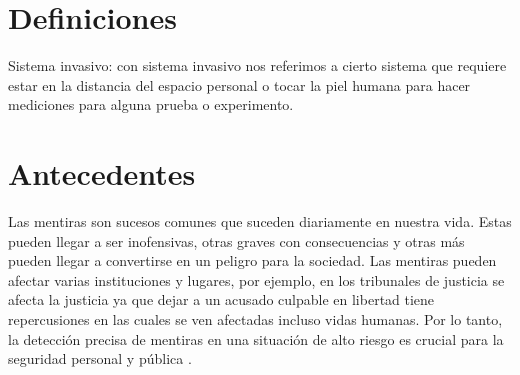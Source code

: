 \begin{onehalfspacing}
\section{Definiciones}
\label{sec:Definiciones}

Sistema invasivo: con sistema invasivo nos referimos a cierto sistema que requiere estar en la distancia del espacio personal o tocar la piel humana para hacer mediciones para alguna prueba o experimento.

\section{Antecedentes}
\label{sec:Antecedentes}

Las mentiras son sucesos comunes que suceden diariamente en nuestra vida. Estas pueden llegar a ser inofensivas, otras graves con consecuencias y otras más pueden llegar a convertirse en un peligro para la sociedad. Las mentiras pueden afectar varias instituciones y lugares, por ejemplo,  en los tribunales de justicia se afecta la justicia ya que dejar a un acusado culpable en libertad tiene repercusiones en las cuales se ven afectadas incluso vidas humanas. Por lo tanto, la detección precisa de mentiras en una situación de alto riesgo es crucial para la seguridad personal y pública \cite{Wu2018DeceptionVideos}.\\


\end{onehalfspacing}
